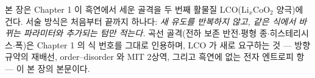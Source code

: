 본 장은 Chapter 1 이 흑연에서 세운 골격을 두 번째 활물질 LCO(Li$_x$CoO$_2$ 양극)에 건다. 서술
방식은 처음부터 끝까지 하나다: \emph{새 유도를 반복하지 않고, 같은 식에서 바뀌는 파라미터와
추가되는 텀만 적는다.} 곡선 골격(전하 보존 반전$\cdot$평형 종$\cdot$히스테리시스$\cdot$폭)은 Chapter 1
의 식 번호를 그대로 인용하며, LCO 가 새로 요구하는 것 --- 방향 규약의 재배선, order--disorder 와
MIT 2상역, 그리고 흑연에 없는 전자 엔트로피 항 --- 이 본 장의 본문이다.

\tableofcontents
\clearpage

